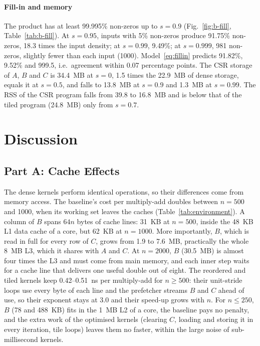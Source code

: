 \documentclass[conference,a4paper]{IEEEtran}
\begin{document}
\paragraph{Fill-in and memory} The product has at least 99.995\% non-zeros up
to $s = 0.9$ (Fig.~\ref{fig:b-fill}, Table~\ref{tab:b-fill}). At $s = 0.95$,
inputs with 5\% non-zeros produce 91.75\% non-zeros, 18.3 times the input
density; at $s = 0.99$, 9.49\%; at $s = 0.999$, 981 non-zeros, slightly fewer
than each input (1000). Model~\eqref{eq:fillin} predicts 91.82\%, 9.52\% and
999.5, i.e.\ agreement within 0.07 percentage points. The CSR storage of $A$,
$B$ and $C$ is 34.4~MB at $s = 0$, 1.5 times the 22.9~MB of dense storage,
equals it at $s = 0.5$, and falls to 13.8~MB at $s = 0.9$ and 1.3~MB at
$s = 0.99$. The RSS of the CSR program falls from 39.8 to 16.8~MB and is below
that of the tiled program (24.8~MB) only from $s = 0.7$.

\section{Discussion}
\label{sec:discussion}

\subsection{Part A: Cache Effects}
\label{sec:disc-a}
The dense kernels perform identical operations, so their differences come from
memory access. The baseline's cost per multiply-add doubles between $n = 500$
and 1000, when its working set leaves the caches
(Table~\ref{tab:environment}). A column of $B$ spans $64n$ bytes of cache
lines: 31~KB at $n = 500$, inside the 48~KB L1 data cache of a core, but 62~KB
at $n = 1000$. More importantly, $B$, which is read in full for every row of
$C$, grows from 1.9 to 7.6~MB, practically the whole 8~MB L3, which it shares
with $A$ and $C$. At $n = 2000$, $B$ (30.5~MB) is almost four times the L3 and
must come from main memory, and each inner step waits for a cache line that
delivers one useful double out of eight. The reordered and tiled kernels keep
0.42--0.51~ns per multiply-add for $n \ge 500$: their unit-stride loops use
every byte of each line and the prefetcher streams $B$ and $C$ ahead of use, so
their exponent stays at 3.0 and their speed-up grows with $n$. For
$n \le 250$, $B$ (78 and 488~KB) fits in the 1~MB L2 of a core, the baseline
pays no penalty, and the extra work of the optimised kernels (clearing $C$,
loading and storing it in every iteration, tile loops) leaves them no faster,
within the large noise of sub-millisecond kernels.
\end{document}
